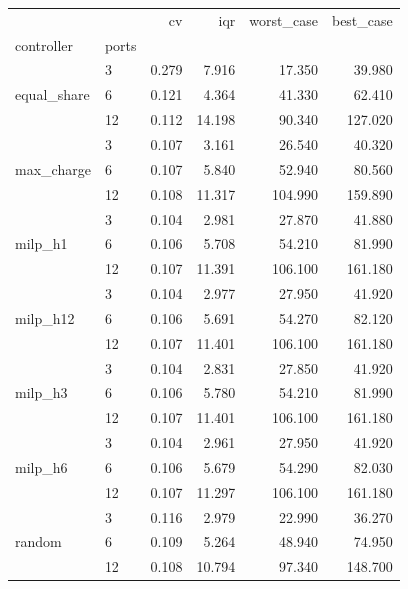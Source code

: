 \begin{tabular}{llrrrr}
\toprule
 &  & cv & iqr & worst_case & best_case \\
controller & ports &  &  &  &  \\
\midrule
\multirow[t]{3}{*}{equal_share} & 3 & 0.279 & 7.916 & 17.350 & 39.980 \\
 & 6 & 0.121 & 4.364 & 41.330 & 62.410 \\
 & 12 & 0.112 & 14.198 & 90.340 & 127.020 \\
\cline{1-6}
\multirow[t]{3}{*}{max_charge} & 3 & 0.107 & 3.161 & 26.540 & 40.320 \\
 & 6 & 0.107 & 5.840 & 52.940 & 80.560 \\
 & 12 & 0.108 & 11.317 & 104.990 & 159.890 \\
\cline{1-6}
\multirow[t]{3}{*}{milp_h1} & 3 & 0.104 & 2.981 & 27.870 & 41.880 \\
 & 6 & 0.106 & 5.708 & 54.210 & 81.990 \\
 & 12 & 0.107 & 11.391 & 106.100 & 161.180 \\
\cline{1-6}
\multirow[t]{3}{*}{milp_h12} & 3 & 0.104 & 2.977 & 27.950 & 41.920 \\
 & 6 & 0.106 & 5.691 & 54.270 & 82.120 \\
 & 12 & 0.107 & 11.401 & 106.100 & 161.180 \\
\cline{1-6}
\multirow[t]{3}{*}{milp_h3} & 3 & 0.104 & 2.831 & 27.850 & 41.920 \\
 & 6 & 0.106 & 5.780 & 54.210 & 81.990 \\
 & 12 & 0.107 & 11.401 & 106.100 & 161.180 \\
\cline{1-6}
\multirow[t]{3}{*}{milp_h6} & 3 & 0.104 & 2.961 & 27.950 & 41.920 \\
 & 6 & 0.106 & 5.679 & 54.290 & 82.030 \\
 & 12 & 0.107 & 11.297 & 106.100 & 161.180 \\
\cline{1-6}
\multirow[t]{3}{*}{random} & 3 & 0.116 & 2.979 & 22.990 & 36.270 \\
 & 6 & 0.109 & 5.264 & 48.940 & 74.950 \\
 & 12 & 0.108 & 10.794 & 97.340 & 148.700 \\
\cline{1-6}
\bottomrule
\end{tabular}
